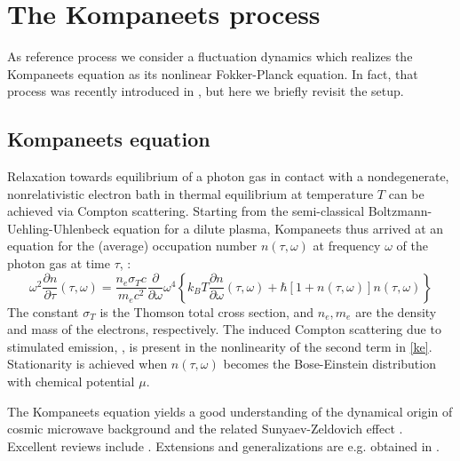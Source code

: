 \documentclass[a4paper,12pt,reqno,superscriptaddress,nofootinbib]{revtex4}
\theoremstyle{plain}
\theoremstyle{definition}
\theoremstyle{remark}
\newcommand{\0}{^{(0)}}
\newcommand{\1}{^{(1)}}
\newcommand{\2}{^{(2)}}
\begin{document}
\section{The Kompaneets process}

As reference process we consider a fluctuation dynamics which realizes the Kompaneets equation as its nonlinear Fokker-Planck equation. In fact, that process was recently introduced in \cite{paper2}, but here we briefly revisit the setup.

\subsection{Kompaneets equation}
Relaxation towards equilibrium of a photon gas in contact with a nondegenerate, nonrelativistic electron bath in thermal equilibrium at temperature $T$ can be achieved via Compton scattering. Starting from the semi-classical Boltzmann-Uehling-Uhlenbeck equation for a dilute plasma, Kompaneets thus arrived at an equation for the (average) occupation number $n(\tau,\omega)$ at frequency $\omega$ of the photon gas at time $\tau$, \cite{kompa}:
\begin{equation}\label{ke}
\omega^2\frac{\partial n}{\partial \tau}(\tau,\omega)= \frac{n_e\sigma_T 
	c}{m_e c^2}\frac{\partial }{\partial \omega}\omega^4\left\{k_B T 
\frac{\partial n}{\partial \omega}(\tau,\omega) + 
\hbar\left[1+n(\tau,\omega)\right]n(\tau,\omega)\right\}
\end{equation}
The constant $\sigma_T$ is the Thomson total cross section, and $n_e,m_e$ are  the density and mass of the electrons, respectively.
The induced Compton scattering due to stimulated emission, \cite{liedahl, blandford}, is present in the nonlinearity of the second term in \eqref{ke}. Stationarity is achieved when $n(\tau,\omega)$ becomes the Bose-Einstein distribution with chemical potential $\mu$.

The Kompaneets equation yields a good understanding of the dynamical origin of cosmic microwave background and the related Sunyaev-Zeldovich effect \cite{sunyaeveffect,sunyaev}.  Excellent reviews include \cite{practical,gui,zeldovich}. Extensions and generalizations are e.g. obtained in \cite{buet, pitrou,barbosa, brown, itoh, itoh2, cooper, kohyama1, kohyama2, kohyama3,paper}.\\
\end{document}
